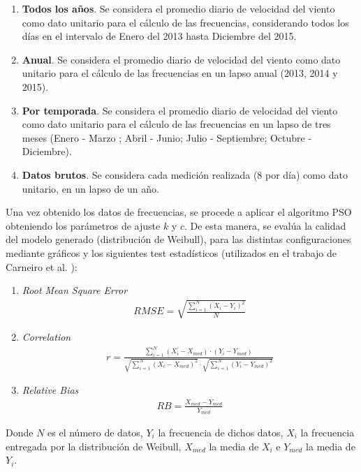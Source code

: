 \begin{enumerate}
	\item \textbf{Todos los años}. Se considera el promedio diario de velocidad del viento como dato unitario para el cálculo de las frecuencias, considerando
	todos los días en el intervalo de Enero del 2013 hasta Diciembre del 2015.
	\item \textbf{Anual}. Se considera el promedio diario de velocidad del viento como dato unitario para el cálculo de las frecuencias en
	un lapso anual (2013, 2014 y 2015).
	\item \textbf{Por temporada}. Se considera el promedio diario de velocidad del viento como dato unitario para el cálculo de las frecuencias en
	un lapso de tres meses (Enero - Marzo ; Abril - Junio; Julio - Septiembre; Octubre - Diciembre).
	\item \textbf{Datos brutos}. Se considera cada medición realizada (8 por día) como dato unitario, en un lapso de un año.
\end{enumerate}

Una vez obtenido los datos de frecuencias, se procede a aplicar el algoritmo PSO obteniendo los parámetros de ajuste $k$ y $c$. De esta manera, se evalúa la calidad del modelo generado (distribución de Weibull), para las distintas configuraciones mediante gráficos y los siguientes test estadísticos (utilizados en el trabajo de Carneiro et al. \cite{Carneiro15}):
\begin{enumerate}
    \item \emph{Root Mean Square Error}
        \begin{align}
            RMSE = \sqrt{\frac{\sum_{i=1}^{N}(X_i - Y_i)^2}{N}}
        \end{align}    
    \item \emph{Correlation}
        \begin{align}
            r = \frac{\sum_{i=1}^{N}(X_i - X_{med})\cdot(Y_i - Y_{med})}{\sqrt{\sum_{i=1}^{N}(X_i - X_{med})^2}\cdot\sqrt{\sum_{i=1}^{N}(Y_i - Y_{med})^2}}
        \end{align}    
    \item \emph{Relative Bias}
        \begin{align}
            RB = \frac{X_{med} - Y_{med}}{Y_{med}}  
        \end{align}    
\end{enumerate}        
Donde $N$ es el número de datos, $Y_i$ la frecuencia de dichos datos, $X_i$ la frecuencia entregada por la distribución de Weibull, $X_{med}$ la media de $X_i$ e $Y_{med}$ la media de $Y_i$. \\

